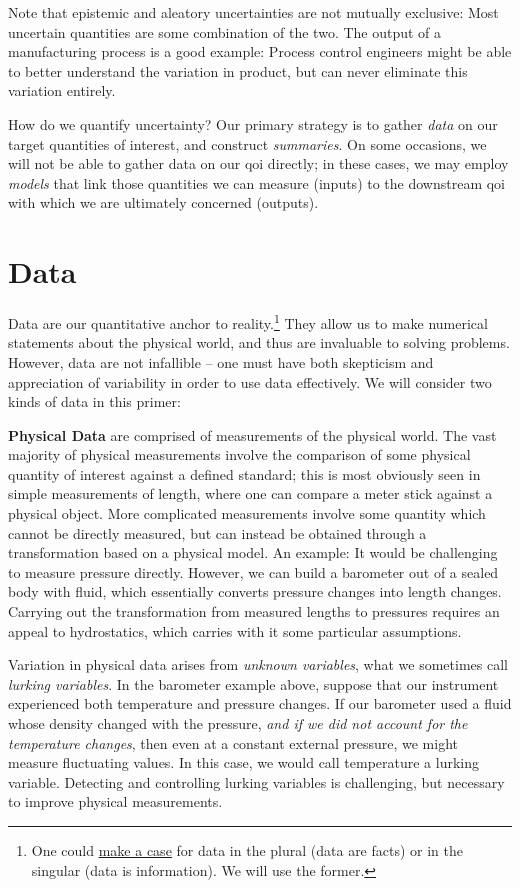 \documentclass[../primer.tex]{subfiles}
\begin{document}
Note that epistemic and aleatory uncertainties are not mutually exclusive: Most
uncertain quantities are some combination of the two. The output of a
manufacturing process is a good example: Process control engineers might be able
to better understand the variation in product, but can never eliminate this
variation entirely.

How do we quantify uncertainty? Our primary strategy is to gather \emph{data} on
our target quantities of interest, and construct \emph{summaries}. On some
occasions, we will not be able to gather data on our qoi directly; in these
cases, we may employ \emph{models} that link those quantities we can measure
(inputs) to the downstream qoi with which we are ultimately concerned (outputs).

\section{Data} \label{sec:ch3-data}
Data are our quantitative anchor to reality.\footnote{One could
  \href{http://phdcomics.com/comics.php?f=1816}{make a case} for data in the
  plural (data are facts) or in the singular (data is information). We will use
  the former.} They allow us to make numerical statements about the physical
world, and thus are invaluable to solving problems. However, data are not
infallible -- one must have both skepticism and appreciation of variability in
order to use data effectively. We will consider two kinds of data in this
primer:

\textbf{Physical Data} are comprised of measurements of the physical world. The
vast majority of physical measurements involve the comparison of some physical
quantity of interest against a defined standard; this is most obviously seen in
simple measurements of length, where one can compare a meter stick against a
physical object. More complicated measurements involve some quantity which
cannot be directly measured, but can instead be obtained through a
transformation based on a physical model. An example: It would be challenging to
measure pressure directly. However, we can build a barometer out of a sealed
body with fluid, which essentially converts pressure changes into length
changes. Carrying out the transformation from measured lengths to pressures
requires an appeal to hydrostatics, which carries with it some particular
assumptions.

Variation in physical data arises from \emph{unknown variables}, what we
sometimes call \emph{lurking variables}.\cite{box1966} In the barometer example
above, suppose that our instrument experienced both temperature and pressure
changes. If our barometer used a fluid whose density changed with the pressure,
\emph{and if we did not account for the temperature changes}, then even at a
constant external pressure, we might measure fluctuating values. In this case,
we would call temperature a lurking variable. Detecting and controlling lurking
variables is challenging, but necessary to improve physical
measurements.\cite{joiner1981,delRosario2017lurking}
\end{document}

